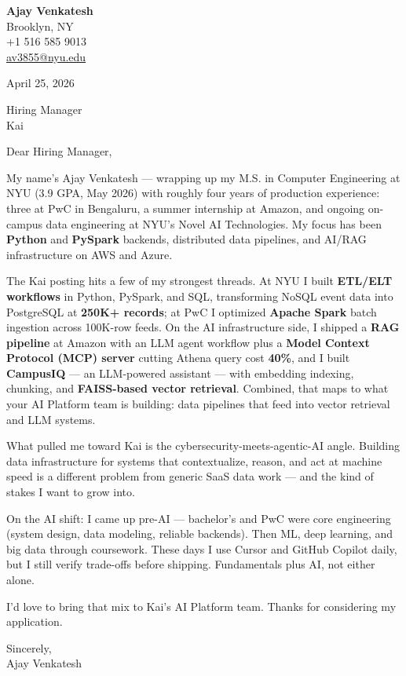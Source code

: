 \documentclass[letterpaper,11pt]{article}
\begin{document}
\begin{flushleft}
\textbf{\large Ajay Venkatesh} \\
Brooklyn, NY \\
+1 516 585 9013 \\
\href{mailto:av3855@nyu.edu}{av3855@nyu.edu}
\end{flushleft}

\vspace{10pt}

April 25, 2026

\vspace{6pt}

Hiring Manager \\
Kai

\vspace{10pt}

Dear Hiring Manager,

My name's Ajay Venkatesh --- wrapping up my M.S. in Computer Engineering at NYU (3.9 GPA, May 2026) with roughly four years of production experience: three at PwC in Bengaluru, a summer internship at Amazon, and ongoing on-campus data engineering at NYU's Novel AI Technologies. My focus has been \textbf{Python} and \textbf{PySpark} backends, distributed data pipelines, and AI/RAG infrastructure on AWS and Azure.

The Kai posting hits a few of my strongest threads. At NYU I built \textbf{ETL/ELT workflows} in Python, PySpark, and SQL, transforming NoSQL event data into PostgreSQL at \textbf{250K+ records}; at PwC I optimized \textbf{Apache Spark} batch ingestion across 100K-row feeds. On the AI infrastructure side, I shipped a \textbf{RAG pipeline} at Amazon with an LLM agent workflow plus a \textbf{Model Context Protocol (MCP) server} cutting Athena query cost \textbf{40\%}, and I built \textbf{CampusIQ} --- an LLM-powered assistant --- with embedding indexing, chunking, and \textbf{FAISS-based vector retrieval}. Combined, that maps to what your AI Platform team is building: data pipelines that feed into vector retrieval and LLM systems.

What pulled me toward Kai is the cybersecurity-meets-agentic-AI angle. Building data infrastructure for systems that contextualize, reason, and act at machine speed is a different problem from generic SaaS data work --- and the kind of stakes I want to grow into.

On the AI shift: I came up pre-AI --- bachelor's and PwC were core engineering (system design, data modeling, reliable backends). Then ML, deep learning, and big data through coursework. These days I use Cursor and GitHub Copilot daily, but I still verify trade-offs before shipping. Fundamentals plus AI, not either alone.

I'd love to bring that mix to Kai's AI Platform team. Thanks for considering my application.

\vspace{12pt}

Sincerely, \\
Ajay Venkatesh
\end{document}
